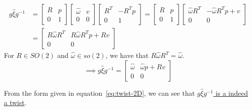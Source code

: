 \begin{align*}
    g \widehat{\xi} g^{-1}
     & =
    \begin{bmatrix}
        R & p \\
        0 & 1
    \end{bmatrix}
    \begin{bmatrix}
        \widehat{\omega} & v \\
        0                & 0
    \end{bmatrix}
    \begin{bmatrix}
        R^{T} & -R^{T} p \\
        0     & 1
    \end{bmatrix}
    =
    \begin{bmatrix}
        R & p \\
        0 & 1
    \end{bmatrix}
    \begin{bmatrix}
        \widehat{\omega} R^{T} & -\widehat{\omega} R^{T} p + v \\
        0                      & 0
    \end{bmatrix}
    \\
     & =
    \begin{bmatrix}
        R \widehat{\omega} R^{T} & R \widehat{\omega} R^{T} p + R v \\
        0                        & 0
    \end{bmatrix}
\end{align*}
For \( R \in SO(2) \) and \( \widehat{\omega} \in so(2) \), we have that \( R \widehat{\omega} R^{T} = \widehat{\omega} \).
\begin{equation*}
    \implies
    g \widehat{\xi} g^{-1}
    =
    \begin{bmatrix}
        \widehat{\omega} & \widehat{\omega} p + R v \\
        0                & 0
    \end{bmatrix}
\end{equation*}

From the form given in equation~\eqref{eq:twist-2D}, we can see that \underline{\( g \widehat{\xi} g^{-1} \) is a indeed a twist}.

